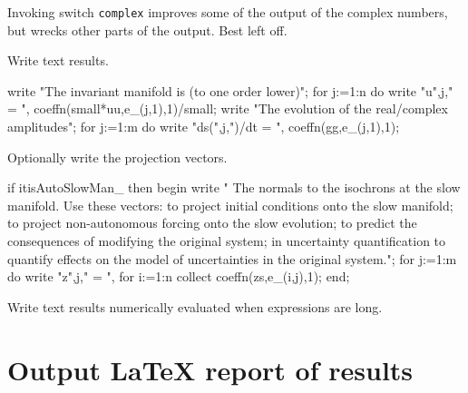 \documentclass[11pt,a5paper]{article}
\begin{document}
Invoking switch \verb|complex| improves some of the output
of the complex numbers, but wrecks other parts of the
output.  Best left off.


Write text results.
\begin{reduce}
write "The invariant manifold is (to one order lower)";
for j:=1:n do write "u",j," = ",
  coeffn(small*uu,e_(j,1),1)/small;
write "The evolution of the real/complex amplitudes";
for j:=1:m do write "ds(",j,")/dt = ",
  coeffn(gg,e_(j,1),1);
\end{reduce}

Optionally write the projection vectors.
\begin{reduce}
if itisAutoSlowMan_ then begin write "
The normals to the isochrons at the slow manifold.
Use these vectors: to project initial conditions
onto the slow manifold; to project non-autonomous
forcing onto the slow evolution; to predict the
consequences of modifying the original system; in
uncertainty quantification to quantify effects on
the model of uncertainties in the original system.";
  for j:=1:m do write "z",j," = ",
    for i:=1:n collect coeffn(zs,e_(i,j),1);
end;
\end{reduce}

Write text results numerically evaluated when expressions
are long.





\section{Output LaTeX report of results}
\localtableofcontents
\end{document}
